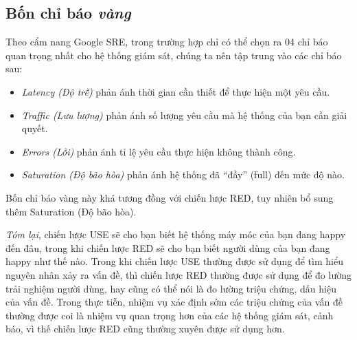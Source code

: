 \subsection{Bốn chỉ báo \textit{vàng}}
Theo cẩm nang Google SRE, trong trường hợp chỉ có thể chọn ra 04 chỉ báo quan trọng nhất cho hệ thống giám sát, chúng ta nên tập trung vào các chỉ báo sau:
\begin{itemize}
    \item \textit{Latency (Độ trễ)} phản ánh thời gian cần thiết để thực hiện một yêu cầu.
    \item \textit{Traffic (Lưu lượng)} phản ánh số lượng yêu cầu mà hệ thống của bạn cần giải quyết.
    \item \textit{Errors (Lỗi)} phản ánh tỉ lệ yêu cầu thực hiện không thành công.
    \item \textit{Saturation (Độ bão hòa)} phản ánh hệ thống đã “đầy” (full) đến mức độ nào.
\end{itemize}
Bốn chỉ báo vàng này khá tương đồng với chiến lược RED, tuy nhiên bổ sung thêm Saturation (Độ bão hòa).

\textit{Tóm lại}, chiến lược USE sẽ cho bạn biết hệ thống máy móc của bạn đang happy đến đâu, trong khi chiến lược RED sẽ cho bạn biết người dùng của bạn đang happy như thế nào. Trong khi chiến lược USE thường được sử dụng để tìm hiểu nguyên nhân xảy ra vấn đề, thì chiến lược RED thường được sử dụng để đo lường trải nghiệm người dùng, hay cũng có thể nói là đo lường triệu chứng, dấu hiệu của vấn đề. Trong thực tiễn, nhiệm vụ xác định sớm các triệu chứng của vấn đề thường được coi là nhiệm vụ quan trọng hơn của các hệ thống giám sát, cảnh báo, vì thế chiến lược RED cũng thường xuyên được sử dụng hơn.
